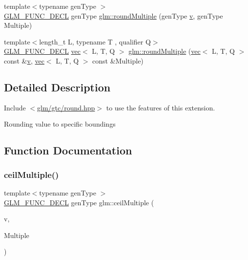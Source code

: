 \begin{DoxyCompactItemize}
\item 
{\footnotesize template$<$typename gen\+Type $>$ }\\\mbox{\hyperlink{setup_8hpp_ab2d052de21a70539923e9bcbf6e83a51}{G\+L\+M\+\_\+\+F\+U\+N\+C\+\_\+\+D\+E\+CL}} gen\+Type \mbox{\hyperlink{group__gtc__round_gab892defcc9c0b0618df7251253dc0fbb}{glm\+::round\+Multiple}} (gen\+Type \mbox{\hyperlink{_s_d_l__opengl_8h_a10a82eabcb59d2fcd74acee063775f90}{v}}, gen\+Type Multiple)
\item 
{\footnotesize template$<$length\+\_\+t L, typename T , qualifier Q$>$ }\\\mbox{\hyperlink{setup_8hpp_ab2d052de21a70539923e9bcbf6e83a51}{G\+L\+M\+\_\+\+F\+U\+N\+C\+\_\+\+D\+E\+CL}} \mbox{\hyperlink{structglm_1_1vec}{vec}}$<$ L, T, Q $>$ \mbox{\hyperlink{group__gtc__round_ga2f1a68332d761804c054460a612e3a4b}{glm\+::round\+Multiple}} (\mbox{\hyperlink{structglm_1_1vec}{vec}}$<$ L, T, Q $>$ const \&\mbox{\hyperlink{_s_d_l__opengl_8h_a10a82eabcb59d2fcd74acee063775f90}{v}}, \mbox{\hyperlink{structglm_1_1vec}{vec}}$<$ L, T, Q $>$ const \&Multiple)
\end{DoxyCompactItemize}


\subsection{Detailed Description}
Include $<$\mbox{\hyperlink{round_8hpp}{glm/gtc/round.\+hpp}}$>$ to use the features of this extension.

Rounding value to specific boundings 

\subsection{Function Documentation}
\mbox{\label{group__gtc__round_ga1d89ac88582aaf4d5dfa5feb4a376fd4}} 
\subsubsection{\texorpdfstring{ceil\+Multiple()}{ceilMultiple()}\hspace{0.1cm}{\footnotesize\ttfamily [1/2]}}
{\footnotesize\ttfamily template$<$typename gen\+Type $>$ \\
\mbox{\hyperlink{setup_8hpp_ab2d052de21a70539923e9bcbf6e83a51}{G\+L\+M\+\_\+\+F\+U\+N\+C\+\_\+\+D\+E\+CL}} gen\+Type glm\+::ceil\+Multiple (\begin{DoxyParamCaption}\item[{gen\+Type}]{v,  }\item[{gen\+Type}]{Multiple }\end{DoxyParamCaption})}

